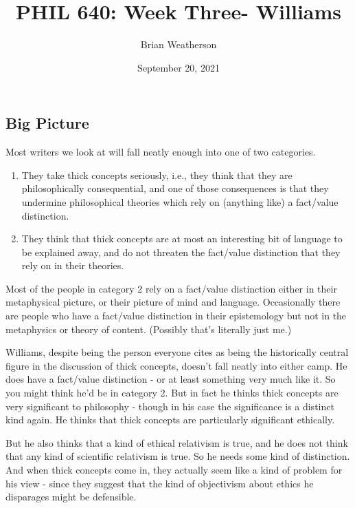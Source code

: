 \documentclass[
]{article}
\title{PHIL 640: Week Three- Williams}
\author{Brian Weatherson}
\date{September 20, 2021}
\providecommand{\tightlist}{%
  \setlength{\itemsep}{0pt}\setlength{\parskip}{0pt}}
\begin{document}
\maketitle

\hypertarget{big-picture}{%
\subsection{Big Picture}\label{big-picture}}

Most writers we look at will fall neatly enough into one of two
categories.

\begin{enumerate}
\def\labelenumi{\arabic{enumi}.}
\tightlist
\item
  They take thick concepts seriously, i.e., they think that they are
  philosophically consequential, and one of those consequences is that
  they undermine philosophical theories which rely on (anything like) a
  fact/value distinction.
\item
  They think that thick concepts are at most an interesting bit of
  language to be explained away, and do not threaten the fact/value
  distinction that they rely on in their theories.
\end{enumerate}

Most of the people in category 2 rely on a fact/value distinction either
in their metaphysical picture, or their picture of mind and language.
Occasionally there are people who have a fact/value distinction in their
epistemology but not in the metaphysics or theory of content. (Possibly
that's literally just me.)

Williams, despite being the person everyone cites as being the
historically central figure in the discussion of thick concepts, doesn't
fall neatly into either camp. He does have a fact/value distinction - or
at least something very much like it. So you might think he'd be in
category 2. But in fact he thinks thick concepts are very significant to
philosophy - though in his case the significance is a distinct kind
again. He thinks that thick concepts are particularly significant
ethically.

But he also thinks that a kind of ethical relativism is true, and he
does not think that any kind of scientific relativism is true. So he
needs some kind of distinction. And when thick concepts come in, they
actually seem like a kind of problem for his view - since they suggest
that the kind of objectivism about ethics he disparages might be
defensible.
\end{document}
